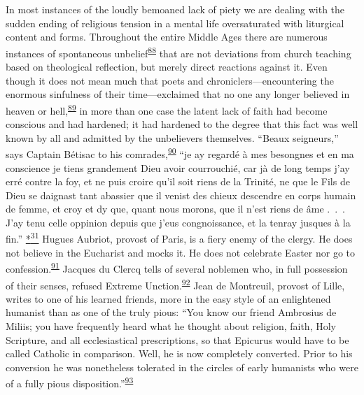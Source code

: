 In most instances of the loudly bemoaned lack of piety we are dealing
with the sudden ending of religious tension in a mental life
oversaturated with liturgical content and forms. Throughout the entire
Middle Ages there are numerous instances of spontaneous
unbelief\textsuperscript{\protect\hypertarget{13_Chapter_Six__THE_DEPICTION_OF_TH.xhtmlux5cux23id_1096}{\protect\hyperlink{23_NOTES.xhtmlux5cux23id_1097}{88}}}
that are not deviations from church teaching based on theological
reflection, but merely direct reactions against it. Even though it does
not mean much that poets and chroniclers---encountering the enormous
sinfulness of their time---exclaimed that no one any longer believed in
heaven or
hell,\textsuperscript{\protect\hypertarget{13_Chapter_Six__THE_DEPICTION_OF_TH.xhtmlux5cux23id_1094}{\protect\hyperlink{23_NOTES.xhtmlux5cux23id_1095}{89}}}
in more than one case the latent lack of faith had become conscious and
had hardened; it had hardened to the degree that this fact was well
known by all and admitted by the unbelievers themselves. ``Beaux
seigneurs,'' says Captain Bétisac to his
comrades,\textsuperscript{\protect\hypertarget{13_Chapter_Six__THE_DEPICTION_OF_TH.xhtmlux5cux23id_1092}{\protect\hyperlink{23_NOTES.xhtmlux5cux23id_1093}{90}}}
``je ay regardé à mes besongnes et en ma conscience je tiens grandement
Dieu avoir courrouchié, car jà de long temps j'ay erré contre la foy, et
ne puis croire qu'il soit riens de la Trinité, ne que le Fils de Dieu se
daignast tant abassier que il venist des chieux descendre en corps
humain de femme, et croy et dy que, quant nous morons, que il
\protect\hypertarget{13_Chapter_Six__THE_DEPICTION_OF_TH.xhtmlux5cux23page_189}{}{}n'est
riens de âme .~.~. J'ay tenu celle oppinion depuis que j'eus
congnoissance, et la tenray jusques à la fin.''
\protect\hypertarget{13_Chapter_Six__THE_DEPICTION_OF_TH.xhtmlux5cux23id_3049}{\protect\hyperlink{23_NOTES.xhtmlux5cux23id_3050}{*\textsuperscript{31}}}
Hugues Aubriot, provost of Paris, is a fiery enemy of the clergy. He
does not believe in the Eucharist and mocks it. He does not celebrate
Easter nor go to
confession.\textsuperscript{\protect\hypertarget{13_Chapter_Six__THE_DEPICTION_OF_TH.xhtmlux5cux23id_1090}{\protect\hyperlink{23_NOTES.xhtmlux5cux23id_1091}{91}}}
Jacques du Clercq tells of several noblemen who, in full possession of
their senses, refused Extreme
Unction.\textsuperscript{\protect\hypertarget{13_Chapter_Six__THE_DEPICTION_OF_TH.xhtmlux5cux23id_1088}{\protect\hyperlink{23_NOTES.xhtmlux5cux23id_1089}{92}}}
Jean de Montreuil, provost of Lille, writes to one of his learned
friends, more in the easy style of an enlightened humanist than as one
of the truly pious: ``You know our friend Ambrosius de Miliis; you have
frequently heard what he thought about religion, faith, Holy Scripture,
and all ecclesiastical prescriptions, so that Epicurus would have to be
called Catholic in comparison. Well, he is now completely converted.
Prior to his conversion he was nonetheless tolerated in the circles of
early humanists who were of a fully pious
disposition.''\textsuperscript{\protect\hypertarget{13_Chapter_Six__THE_DEPICTION_OF_TH.xhtmlux5cux23id_1086}{\protect\hyperlink{23_NOTES.xhtmlux5cux23id_1087}{93}}}

